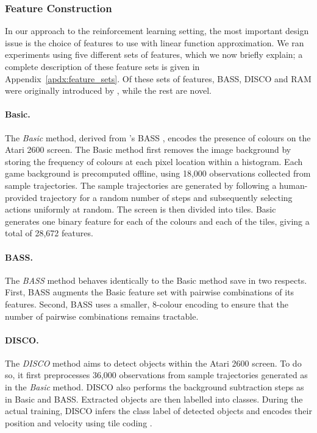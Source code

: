 \documentclass[twoside,11pt]{article}
\begin{document}
\subsubsection{Feature Construction}
In our approach to the reinforcement learning setting, the most important design issue is the choice of features to use with linear function approximation.
We ran experiments using five different sets of features, which we now briefly explain;
a complete description of these feature sets is given in Appendix~\ref{apdx:feature_sets}. Of these
sets of features, BASS, DISCO and RAM were originally introduced by , while the rest are novel.

\paragraph{Basic.}
The \emph{Basic} method, derived from \citeauthor{naddaf2010}'s BASS \citeyear{naddaf2010}, encodes the presence of colours on the Atari 2600 screen.
The Basic method first removes the image background by storing the frequency of colours at each pixel location within a histogram. 
Each game background is precomputed offline, using 18,000 observations collected from sample trajectories. The sample trajectories are generated by following a human-provided trajectory for a random number of steps and subsequently selecting actions uniformly at random.  
The screen is then divided into  tiles. 
Basic generates one binary feature for each of the  colours and each of the tiles, giving a total of 28,672 features.

\paragraph{BASS.} The \emph{BASS} method behaves identically to the Basic method save in two respects. First, BASS augments the Basic feature set with pairwise combinations of its features. Second, BASS uses a smaller, 8-colour encoding to ensure that the number of pairwise combinations remains tractable. 

\paragraph{DISCO.} The \emph{DISCO} method aims to detect objects within the Atari 2600 screen. To do so, it first preprocesses 36,000 observations from sample trajectories generated as in the \emph{Basic} method. DISCO also performs the background subtraction steps as in Basic and BASS. Extracted objects are then labelled into classes. During the actual training, DISCO infers the class label of detected objects and encodes their position and velocity using tile coding \cite{sutton_barto_98}.
\end{document}
